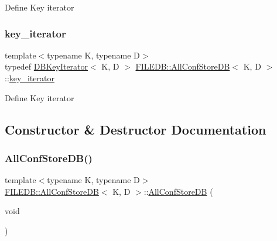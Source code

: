 Define Key iterator \mbox{\label{classFILEDB_1_1AllConfStoreDB_a2ce8981ca7049ed0c2c6e438873a9c1b}} 
\subsubsection{\texorpdfstring{key\_iterator}{key\_iterator}\hspace{0.1cm}{\footnotesize\ttfamily [2/2]}}
{\footnotesize\ttfamily template$<$typename K, typename D$>$ \\
typedef \mbox{\hyperlink{classFILEDB_1_1DBKeyIterator}{D\+B\+Key\+Iterator}}$<$ K, D $>$ \mbox{\hyperlink{classFILEDB_1_1AllConfStoreDB}{F\+I\+L\+E\+D\+B\+::\+All\+Conf\+Store\+DB}}$<$ K, D $>$\+::\mbox{\hyperlink{classFILEDB_1_1AllConfStoreDB_a2ce8981ca7049ed0c2c6e438873a9c1b}{key\+\_\+iterator}}}

Define Key iterator 

\subsection{Constructor \& Destructor Documentation}
\mbox{\label{classFILEDB_1_1AllConfStoreDB_a72b72501b29029e2bfb682565f96eac0}} 
\subsubsection{\texorpdfstring{AllConfStoreDB()}{AllConfStoreDB()}\hspace{0.1cm}{\footnotesize\ttfamily [1/6]}}
{\footnotesize\ttfamily template$<$typename K, typename D$>$ \\
\mbox{\hyperlink{classFILEDB_1_1AllConfStoreDB}{F\+I\+L\+E\+D\+B\+::\+All\+Conf\+Store\+DB}}$<$ K, D $>$\+::\mbox{\hyperlink{classFILEDB_1_1AllConfStoreDB}{All\+Conf\+Store\+DB}} (\begin{DoxyParamCaption}\item[{void}]{ }\end{DoxyParamCaption})\hspace{0.3cm}{\ttfamily [inline]}}

